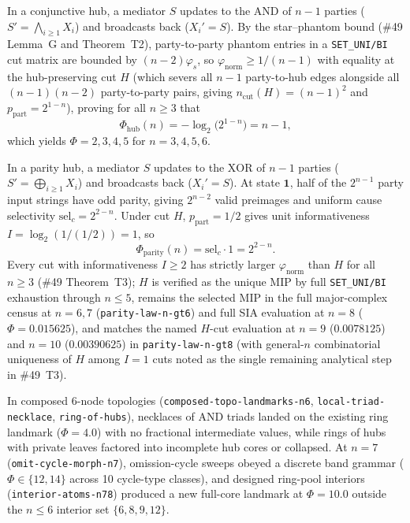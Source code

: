 \documentclass[11pt,a4paper]{article}
\begin{document}
In a conjunctive hub, a mediator $S$ updates to the $\mathrm{AND}$ of $n - 1$ parties ($S' = \bigwedge_{i \ge 1} X_i$) and broadcasts back ($X_i' = S$). By the star--phantom bound (\#49 Lemma~G and Theorem~T2), party-to-party phantom entries in a \texttt{SET\_UNI/BI} cut matrix are bounded by $(n - 2)\varphi_s$, so $\varphi_{\mathrm{norm}} \ge 1/(n - 1)$ with equality at the hub-preserving cut $H$ (which severs all $n - 1$ party-to-hub edges alongside all $(n - 1)(n - 2)$ party-to-party pairs, giving $n_{\mathrm{cut}}(H) = (n - 1)^2$ and $p_{\mathrm{part}} = 2^{1-n}$), proving for all $n \ge 3$ that
\begin{equation}
  \Phi_{\mathrm{hub}}(n) = -\log_2\!\bigl(2^{1-n}\bigr) = n - 1, \label{eq:hub}
\end{equation}
which yields $\Phi = 2, 3, 4, 5$ for $n = 3, 4, 5, 6$.

In a parity hub, a mediator $S$ updates to the $\mathrm{XOR}$ of $n - 1$ parties ($S' = \bigoplus_{i \ge 1} X_i$) and broadcasts back ($X_i' = S$). At state $\mathbf{1}$, half of the $2^{n-1}$ party input strings have odd parity, giving $2^{n-2}$ valid preimages and uniform cause selectivity $\mathrm{sel}_c = 2^{2-n}$. Under cut $H$, $p_{\mathrm{part}} = 1/2$ gives unit informativeness $I = \log_2(1 / (1/2)) = 1$, so
\begin{equation}
  \Phi_{\mathrm{parity}}(n) = \mathrm{sel}_c \cdot 1 = 2^{2-n}. \label{eq:parity}
\end{equation}
Every cut with informativeness $I \ge 2$ has strictly larger $\varphi_{\mathrm{norm}}$ than $H$ for all $n \ge 3$ (\#49 Theorem~T3); $H$ is verified as the unique MIP by full \texttt{SET\_UNI/BI} exhaustion through $n \le 5$, remains the selected MIP in the full major-complex census at $n = 6, 7$ (\texttt{parity-law-n-gt6}) and full SIA evaluation at $n = 8$ ($\Phi = 0.015625$), and matches the named $H$-cut evaluation at $n = 9$ ($0.0078125$) and $n = 10$ ($0.00390625$) in \texttt{parity-law-n-gt8} (with general-$n$ combinatorial uniqueness of $H$ among $I = 1$ cuts noted as the single remaining analytical step in \#49~T3).

In composed 6-node topologies (\texttt{composed-topo-landmarks-n6}, \texttt{local-triad-necklace}, \texttt{ring-of-hubs}), necklaces of $\mathrm{AND}$ triads landed on the existing ring landmark ($\Phi = 4.0$) with no fractional intermediate values, while rings of hubs with private leaves factored into incomplete hub cores or collapsed. At $n = 7$ (\texttt{omit-cycle-morph-n7}), omission-cycle sweeps obeyed a discrete band grammar ($\Phi \in \{12, 14\}$ across 10 cycle-type classes), and designed ring-pool interiors (\texttt{interior-atoms-n78}) produced a new full-core landmark at $\Phi = 10.0$ outside the $n \le 6$ interior set $\{6, 8, 9, 12\}$.
\end{document}
